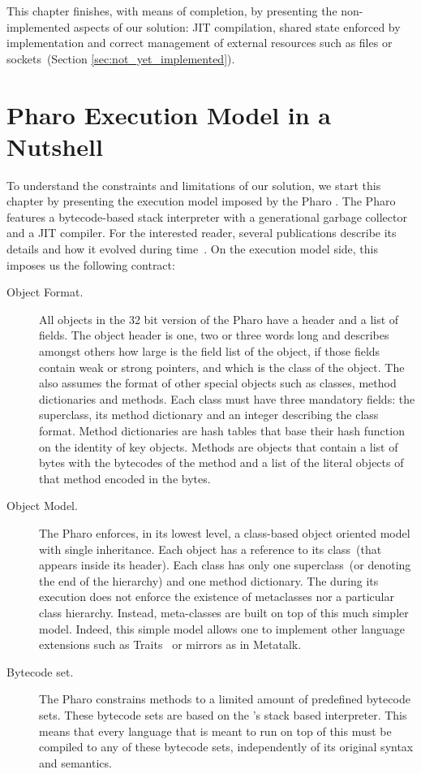 This chapter finishes, with means of completion, by presenting the non-implemented aspects of our solution: JIT compilation, shared state enforced by \VM implementation and correct management of external resources such as files or sockets~(Section \ref{sec:not_yet_implemented}).

\section{Pharo Execution Model in a Nutshell}\label{sec:pharo_execution_model}

To understand the constraints and limitations of our solution, we start this chapter by presenting the execution model imposed by the Pharo \VM. The Pharo \VM features a bytecode-based stack interpreter with a generational garbage collector and a JIT compiler. For the interested reader, several publications describe its details and how it evolved during time~\cite{Gold83a,Inga97a,Mira11a}. On the execution model side, this \VM imposes us the following contract:

\begin{description}

\item[Object Format.] All objects in the 32 bit version of the Pharo \VM have a header and a list of fields. The object header is one, two or three words long and describes amongst others how large is the field list of the object, if those fields contain weak or strong pointers, and which is the class of the object. The \VM also assumes the format of other special objects such as classes, method dictionaries and methods. Each class must have three mandatory fields: the superclass, its method dictionary and an integer describing the class format. Method dictionaries are hash tables that base their hash function on the identity of key objects. Methods are objects that contain a list of bytes with the bytecodes of the method and a list of the literal objects of that method encoded in the bytes.

\item[Object Model.] The Pharo \VM enforces, in its lowest level, a class-based object oriented model with single inheritance. Each object has a reference to its class~(that appears inside its header). Each class has only one superclass~(or  denoting the end of the hierarchy) and one method dictionary. The \VM during its execution does not enforce the existence of metaclasses nor a particular class hierarchy. Instead, meta-classes are built on top of this much simpler model. Indeed, this simple model allows one to implement other language extensions such as Traits~\cite{Scha03a} or mirrors as in Metatalk\cite{Papo11a}.

\item[Bytecode set.] The Pharo \VM constrains methods to a limited amount of predefined bytecode sets. These bytecode sets are based on the \VM's stack based interpreter. This means that every language that is meant to run on top of this \VM must be compiled to any of these bytecode sets, independently of its original syntax and semantics. 

\end{description}

